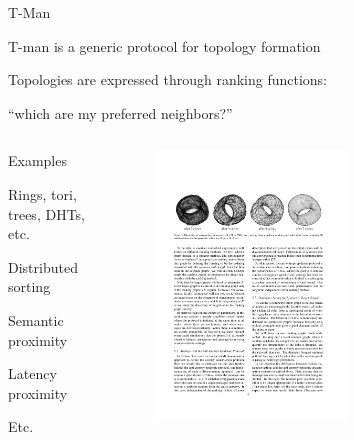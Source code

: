 \begin{frame}{T-Man}
	
\BIL
\item T-man is a generic protocol for topology formation
\item Topologies are expressed through ranking functions:
	\BI
	\item “which are my preferred neighbors?”
	\EI
\EIL

\begin{columns}
\begin{column}{0.5\textwidth}
\BIL	
\item Examples
\BI
\item Rings, tori, trees, DHTs, etc.
\item Distributed sorting
\item Semantic proximity
\item Latency proximity 
\item Etc.	
\EI
\EIL
\end{column}	
\begin{column}{0.5\textwidth}
	\begin{figure}
	\includegraphics[width=0.6\textwidth]{torus}
	\end{figure}
\end{column}	
\end{columns}	
\end{frame}


